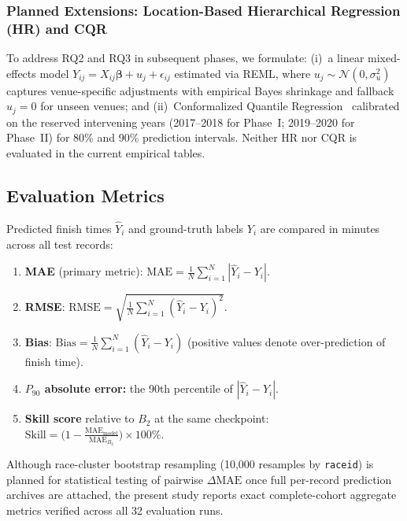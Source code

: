 \documentclass[11pt,a4paper]{article}
\begin{document}
\subsubsection{Planned Extensions: Location-Based Hierarchical
Regression (HR) and CQR}
\label{sec:hr}
To address RQ2 and RQ3 in subsequent phases, we formulate: (i)~a
linear mixed-effects model $Y_{ij} = X_{ij}\boldsymbol{\beta} + u_j +
\epsilon_{ij}$ estimated via REML, where $u_j \sim \mathcal{N}(0,
\sigma_u^2)$ captures venue-specific adjustments with empirical Bayes
shrinkage and fallback $u_j = 0$ for unseen venues; and
(ii)~Conformalized Quantile Regression~\cite{romano2019conformalized}
calibrated on the reserved intervening years (2017--2018 for Phase~I;
2019--2020 for Phase~II) for 80\% and 90\% prediction intervals.
Neither HR nor CQR is evaluated in the current empirical tables.

\subsection{Evaluation Metrics}

Predicted finish times $\hat{Y}_i$ and ground-truth labels $Y_i$ are
compared in minutes across all test records:
\begin{enumerate}[leftmargin=*]
  \item \textbf{MAE} (primary metric):
  $\mathrm{MAE} = \frac{1}{N}\sum_{i=1}^{N}|\hat{Y}_i - Y_i|$.
  \item \textbf{RMSE}:
  $\mathrm{RMSE} = \sqrt{\frac{1}{N}\sum_{i=1}^{N}(\hat{Y}_i-Y_i)^2}$.
  \item \textbf{Bias}:
  $\mathrm{Bias} = \frac{1}{N}\sum_{i=1}^{N}(\hat{Y}_i - Y_i)$
  (positive values denote over-prediction of finish time).
  \item \textbf{$P_{90}$ absolute error:} the 90th percentile of
  $|\hat{Y}_i - Y_i|$.
  \item \textbf{Skill score} relative to $B_2$ at the same checkpoint:
  $\mathrm{Skill} = \bigl(1 - \frac{\mathrm{MAE}_{\mathrm{model}}}
  {\mathrm{MAE}_{B_2}}\bigr)\times 100\%$.
\end{enumerate}
Although race-cluster bootstrap resampling (10{,}000 resamples by
\texttt{raceid}) is planned for statistical testing of pairwise
$\Delta\mathrm{MAE}$ once full per-record prediction archives are
attached, the present study reports exact complete-cohort aggregate
metrics verified across all 32 evaluation runs.

\end{document}
